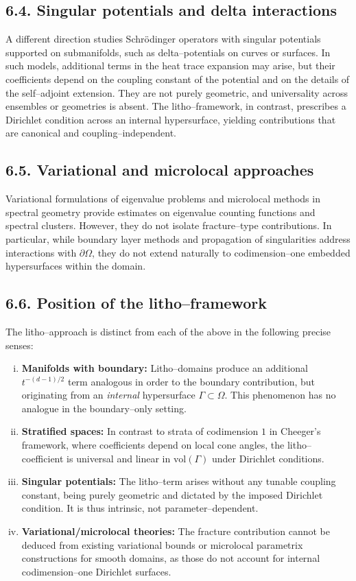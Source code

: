 \subsection*{6.4. Singular potentials and delta interactions}
A different direction studies Schrödinger operators with singular potentials supported on submanifolds, such as delta–potentials on curves or surfaces. In such models, additional terms in the heat trace expansion may arise, but their coefficients depend on the coupling constant of the potential and on the details of the self–adjoint extension. They are not purely geometric, and universality across ensembles or geometries is absent. The litho–framework, in contrast, prescribes a Dirichlet condition across an internal hypersurface, yielding contributions that are canonical and coupling–independent.

\subsection*{6.5. Variational and microlocal approaches}
Variational formulations of eigenvalue problems and microlocal methods in spectral geometry provide estimates on eigenvalue counting functions and spectral clusters. However, they do not isolate fracture–type contributions. In particular, while boundary layer methods and propagation of singularities address interactions with $\partial\Omega$, they do not extend naturally to codimension–one embedded hypersurfaces within the domain.

\subsection*{6.6. Position of the litho–framework}
The litho–approach is distinct from each of the above in the following precise senses:
\begin{enumerate}[(i)]
\item \textbf{Manifolds with boundary:} Litho–domains produce an additional $t^{-(d-1)/2}$ term analogous in order to the boundary contribution, but originating from an \emph{internal} hypersurface $\Gamma\subset\Omega$. This phenomenon has no analogue in the boundary–only setting.
\item \textbf{Stratified spaces:} In contrast to strata of codimension $1$ in Cheeger’s framework, where coefficients depend on local cone angles, the litho–coefficient is universal and linear in $\mathrm{vol}(\Gamma)$ under Dirichlet conditions.
\item \textbf{Singular potentials:} The litho–term arises without any tunable coupling constant, being purely geometric and dictated by the imposed Dirichlet condition. It is thus intrinsic, not parameter–dependent.
\item \textbf{Variational/microlocal theories:} The fracture contribution cannot be deduced from existing variational bounds or microlocal parametrix constructions for smooth domains, as those do not account for internal codimension–one Dirichlet surfaces.
\end{enumerate}

